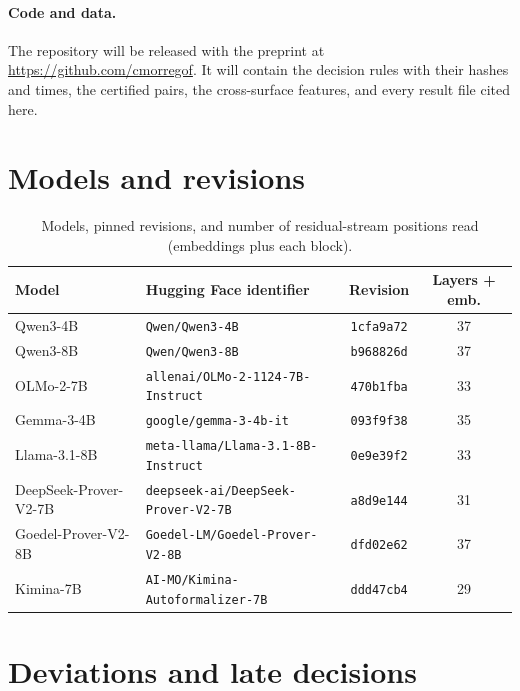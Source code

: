 \documentclass[10pt]{article}
\newcommand{\vr}[1]{\texttt{#1}}
\begin{document}
\paragraph{Code and data.}
The repository will be released with the preprint at \url{https://github.com/cmorregof}. It will contain the decision
rules with their hashes and times, the certified pairs, the cross-surface features, and every result file cited
here.





\appendix
\section{Models and revisions}\label{app:modelos}
\begin{table}[h]
\centering
\caption{Models, pinned revisions, and number of residual-stream positions read (embeddings plus each block).}
\vspace{2pt}
\begin{tabular}{@{}llcc@{}}
\toprule
Model & Hugging Face identifier & Revision & Layers + emb.\\
\midrule
Qwen3-4B              & \vr{Qwen/Qwen3-4B}                         & \vr{1cfa9a72} & 37\\
Qwen3-8B              & \vr{Qwen/Qwen3-8B}                         & \vr{b968826d} & 37\\
OLMo-2-7B             & \vr{allenai/OLMo-2-1124-7B-Instruct}       & \vr{470b1fba} & 33\\
Gemma-3-4B            & \vr{google/gemma-3-4b-it}                  & \vr{093f9f38} & 35\\
Llama-3.1-8B          & \vr{meta-llama/Llama-3.1-8B-Instruct}      & \vr{0e9e39f2} & 33\\
DeepSeek-Prover-V2-7B & \vr{deepseek-ai/DeepSeek-Prover-V2-7B}     & \vr{a8d9e144} & 31\\
Goedel-Prover-V2-8B   & \vr{Goedel-LM/Goedel-Prover-V2-8B}         & \vr{dfd02e62} & 37\\
Kimina-7B             & \vr{AI-MO/Kimina-Autoformalizer-7B}        & \vr{ddd47cb4} & 29\\
\bottomrule
\end{tabular}
\end{table}

\section{Deviations and late decisions}\label{app:desviaciones}
\end{document}
